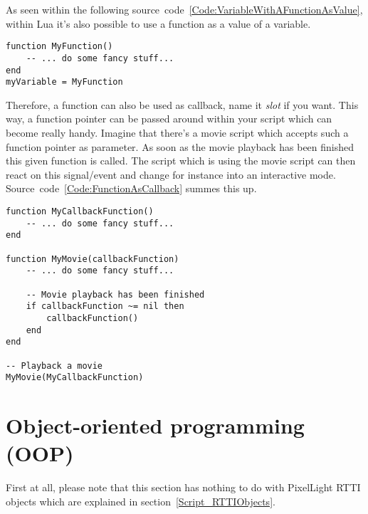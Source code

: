 As seen within the following source~code~\ref{Code:VariableWithAFunctionAsValue}, within Lua it's also possible to use a function as a value of a variable.
\begin{lstlisting}[float=htb,label=Code:VariableWithAFunctionAsValue,caption={Variable with a function as value}]
function MyFunction()
	-- ... do some fancy stuff...
end
myVariable = MyFunction
\end{lstlisting}
Therefore, a function can also be used as callback, name it \emph{slot} if you want. This way, a function pointer can be passed around within your script which can become really handy. Imagine that there's a movie script which accepts such a function pointer as parameter. As soon as the movie playback has been finished this given function is called. The script which is using the movie script can then react on this signal/event and change for instance into an interactive mode. Source~code~\ref{Code:FunctionAsCallback} summes this up.
\begin{lstlisting}[float=htb,label=Code:FunctionAsCallback,caption={Function as callback}]
function MyCallbackFunction()
	-- ... do some fancy stuff...
end

function MyMovie(callbackFunction)
	-- ... do some fancy stuff...

	-- Movie playback has been finished
	if callbackFunction ~= nil then
		callbackFunction()
	end
end

-- Playback a movie
MyMovie(MyCallbackFunction)
\end{lstlisting}




\section{Object-oriented programming (OOP)}
First at all, please note that this section has nothing to do with PixelLight RTTI objects which are explained in section~\ref{Script_RTTIObjects}.

